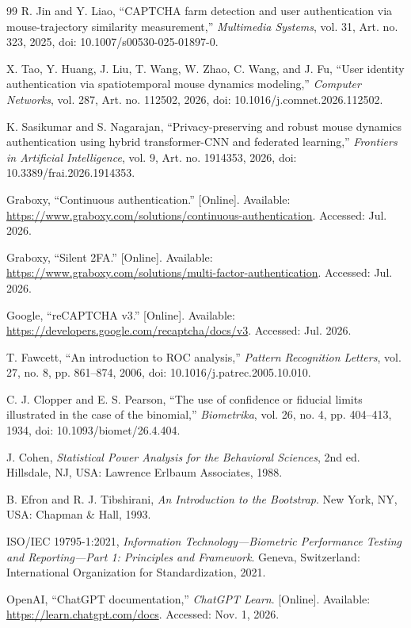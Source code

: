 \documentclass[conference]{IEEEtran}
\begin{document}
\begin{thebibliography}{99}
R. Jin and Y. Liao,
``CAPTCHA farm detection and user authentication via mouse-trajectory similarity measurement,''
\emph{Multimedia Systems}, vol. 31, Art. no. 323, 2025,
doi: 10.1007/s00530-025-01897-0.

X. Tao, Y. Huang, J. Liu, T. Wang, W. Zhao, C. Wang, and J. Fu,
``User identity authentication via spatiotemporal mouse dynamics modeling,''
\emph{Computer Networks}, vol. 287, Art. no. 112502, 2026,
doi: 10.1016/j.comnet.2026.112502.

K. Sasikumar and S. Nagarajan,
``Privacy-preserving and robust mouse dynamics authentication using hybrid transformer-CNN and federated learning,''
\emph{Frontiers in Artificial Intelligence}, vol. 9, Art. no. 1914353, 2026,
doi: 10.3389/frai.2026.1914353.

Graboxy,
``Continuous authentication.''
[Online]. Available:
\url{https://www.graboxy.com/solutions/continuous-authentication}.
Accessed: Jul. 2026.

Graboxy,
``Silent 2FA.''
[Online]. Available:
\url{https://www.graboxy.com/solutions/multi-factor-authentication}.
Accessed: Jul. 2026.

Google,
``reCAPTCHA v3.''
[Online]. Available:
\url{https://developers.google.com/recaptcha/docs/v3}.
Accessed: Jul. 2026.

T. Fawcett,
``An introduction to ROC analysis,''
\emph{Pattern Recognition Letters},
vol. 27, no. 8, pp. 861--874, 2006,
doi: 10.1016/j.patrec.2005.10.010.

C. J. Clopper and E. S. Pearson,
``The use of confidence or fiducial limits illustrated in the case of the
binomial,''
\emph{Biometrika},
vol. 26, no. 4, pp. 404--413, 1934,
doi: 10.1093/biomet/26.4.404.

J. Cohen,
\emph{Statistical Power Analysis for the Behavioral Sciences},
2nd ed. Hillsdale, NJ, USA: Lawrence Erlbaum Associates, 1988.

B. Efron and R. J. Tibshirani,
\emph{An Introduction to the Bootstrap}.
New York, NY, USA: Chapman \& Hall, 1993.

ISO/IEC 19795-1:2021,
\emph{Information Technology---Biometric Performance Testing and
Reporting---Part 1: Principles and Framework}.
Geneva, Switzerland: International Organization for Standardization, 2021.

OpenAI,
``ChatGPT documentation,''
\emph{ChatGPT Learn}.
[Online]. Available:
\url{https://learn.chatgpt.com/docs}.
Accessed: Nov. 1, 2026.

\end{thebibliography}
\end{document}
